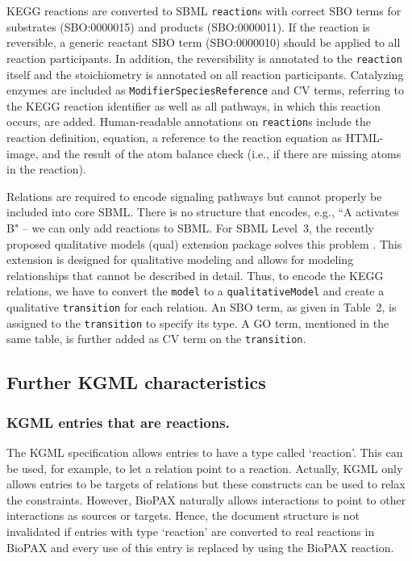 \documentclass[10pt]{bmc_article}
\newenvironment{bmcformat}{\baselineskip20pt\sloppy\setboolean{publ}{false}}{\baselineskip20pt\sloppy}
\newcommand{\model}{\texttt{model}}
\newcommand{\ModifierSpeciesReference}{\texttt{Mo\-di\-fier\-Species\-Reference}}
\newcommand{\qualitativeModel}{\texttt{qualitative\-Model}}
\newcommand{\reaction}{\texttt{re\-ac\-tion}}
\newcommand{\reactions}{\texttt{re\-ac\-tion}s}
\newcommand{\transition}{\texttt{transition}}
\begin{document}
\begin{bmcformat}
KEGG reactions are converted to SBML \reactions{} with correct SBO terms for substrates (SBO:0000015) and products (SBO:0000011). If the reaction is reversible, a generic reactant SBO term (SBO:0000010) should be applied to all reaction participants. In addition, the reversibility is annotated to the \reaction{} itself and the stoichiometry is annotated on all reaction participants. Catalyzing enzymes are included as \ModifierSpeciesReference{} and CV terms, referring to the KEGG reaction identifier as well as all pathways, in which this reaction occurs, are added. Human-readable annotations on \reactions{} include the reaction definition, equation, a reference to the reaction equation as HTML-image, and the result of the atom balance check (i.e., if there are missing atoms in the reaction).

Relations are required to encode signaling pathways but cannot properly be included into core SBML. There is no structure that encodes, e.g., ``A activates B" -- we can only add reactions to SBML. For SBML Level~3, the recently proposed qualitative models (qual) extension package solves this problem \cite{QualSpecification}. This extension is designed for qualitative modeling and allows for
modeling relationships that cannot be described in detail.
Thus, to encode the KEGG relations, we have to convert the \model{} to a \qualitativeModel{} and create a qualitative \transition{} for each relation. An SBO term, as given in Table~2, is assigned to the \transition{} to specify its type. A GO term, mentioned in the same table, is further added as CV term on the \transition{}.


\subsection*{Further KGML characteristics}

\subsubsection*{KGML entries that are reactions.}
The KGML specification allows entries to have a type called `reaction'. This can be used, for example, to let a relation point to a reaction. Actually, KGML only allows entries to be targets of relations but these constructs can be used to relax the constraints. However, BioPAX naturally allows interactions to point to other interactions as sources or targets. Hence, the document structure is not invalidated if entries with type `reaction' are converted to real reactions in BioPAX and every use of this entry is replaced by using the BioPAX reaction.


\end{bmcformat}
\end{document}
